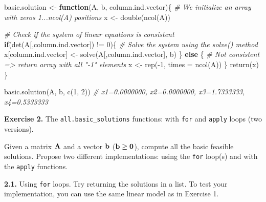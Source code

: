 \documentclass[
]{article}
\newenvironment{Shaded}{\begin{snugshade}}{\end{snugshade}}
\newcommand{\AttributeTok}[1]{\textcolor[rgb]{0.77,0.63,0.00}{#1}}
\newcommand{\CommentTok}[1]{\textcolor[rgb]{0.56,0.35,0.01}{\textit{#1}}}
\newcommand{\ControlFlowTok}[1]{\textcolor[rgb]{0.13,0.29,0.53}{\textbf{#1}}}
\newcommand{\DecValTok}[1]{\textcolor[rgb]{0.00,0.00,0.81}{#1}}
\newcommand{\FunctionTok}[1]{\textcolor[rgb]{0.00,0.00,0.00}{#1}}
\newcommand{\NormalTok}[1]{#1}
\newcommand{\OtherTok}[1]{\textcolor[rgb]{0.56,0.35,0.01}{#1}}
\newcommand{\SpecialCharTok}[1]{\textcolor[rgb]{0.00,0.00,0.00}{#1}}
\begin{document}
\begin{Shaded}
\begin{Highlighting}[]
\NormalTok{basic.solution }\OtherTok{\textless{}{-}} \ControlFlowTok{function}\NormalTok{(A, b, column.ind.vector)\{}
  \CommentTok{\# We initialize an array with zeros 1...ncol(A) positions}
\NormalTok{  x }\OtherTok{\textless{}{-}} \FunctionTok{double}\NormalTok{(}\FunctionTok{ncol}\NormalTok{(A))}
  
  \CommentTok{\# Check if the system of linear equations is consistent}
  \ControlFlowTok{if}\NormalTok{(}\FunctionTok{det}\NormalTok{(A[,column.ind.vector]) }\SpecialCharTok{!=} \DecValTok{0}\NormalTok{)\{}
    \CommentTok{\# Solve the system using the solve() method}
\NormalTok{    x[column.ind.vector] }\OtherTok{\textless{}{-}} \FunctionTok{solve}\NormalTok{(A[,column.ind.vector], b)}
\NormalTok{  \} }\ControlFlowTok{else}\NormalTok{ \{}
    \CommentTok{\# Not consistent =\textgreater{} return array with all "{-}1" elements}
\NormalTok{    x }\OtherTok{\textless{}{-}} \FunctionTok{rep}\NormalTok{(}\SpecialCharTok{{-}}\DecValTok{1}\NormalTok{, }\AttributeTok{times =} \FunctionTok{ncol}\NormalTok{(A))}
\NormalTok{  \}}
  \FunctionTok{return}\NormalTok{(x)}
\NormalTok{\}}

\FunctionTok{basic.solution}\NormalTok{(A, b, }\FunctionTok{c}\NormalTok{(}\DecValTok{1}\NormalTok{, }\DecValTok{2}\NormalTok{))}
\CommentTok{\# x1=0.0000000, x2=0.0000000, x3=1.7333333, x4=0.5333333}
\end{Highlighting}
\end{Shaded}

\textbf{Exercise 2.} The \texttt{all.basic\_solutions} functions: with
\texttt{for} and \texttt{apply} loops (two versions).

Given a matrix \({\bf A}\) and a vector \({\bf b}\)
(\({\bf b}\geq {\bf 0}\)), compute all the basic feasible solutions.
Propose two different implementations: using the \texttt{for} loop(s)
and with the \texttt{apply} functions.

\textbf{2.1.} Using \texttt{for} loops. Try returning the solutions in a
list. To test your implementation, you can use the same linear model as
in Exercise 1.
\end{document}
